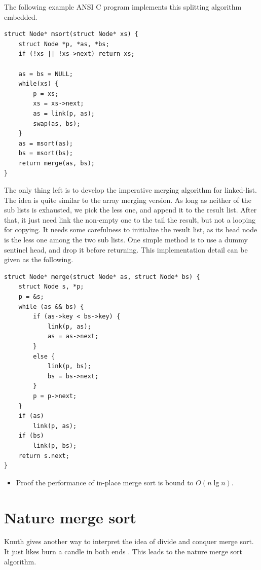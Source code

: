 \documentclass[b5paper]{article}
\begin{document}
The following example ANSI C program implements this splitting algorithm embedded.

\lstset{language=C}
\begin{lstlisting}
struct Node* msort(struct Node* xs) {
    struct Node *p, *as, *bs;
    if (!xs || !xs->next) return xs;

    as = bs = NULL;
    while(xs) {
        p = xs;
        xs = xs->next;
        as = link(p, as);
        swap(as, bs);
    }
    as = msort(as);
    bs = msort(bs);
    return merge(as, bs);
}
\end{lstlisting}

The only thing left is to develop the imperative merging algorithm for linked-list. The idea
is quite similar to the array merging version. As long as neither of the sub lists is exhausted,
we pick the less one, and append it to the result list. After that, it just need link the
non-empty one to the tail the result, but not a looping for copying. It needs some carefulness
to initialize the result list, as its head node is the less one among the two sub lists.
One simple method is to use a dummy sentinel head, and drop it before returning. This implementation
detail can be given as the following.

\lstset{language=C}
\begin{lstlisting}
struct Node* merge(struct Node* as, struct Node* bs) {
    struct Node s, *p;
    p = &s;
    while (as && bs) {
        if (as->key < bs->key) {
            link(p, as);
            as = as->next;
        }
        else {
            link(p, bs);
            bs = bs->next;
        }
        p = p->next;
    }
    if (as)
        link(p, as);
    if (bs)
        link(p, bs);
    return s.next;
}
\end{lstlisting}

\begin{Exercise}
\begin{itemize}
\item Proof the performance of in-place merge sort is bound to $O(n \lg n)$.
\end{itemize}
\end{Exercise}

\section{Nature merge sort}
Knuth gives another way to interpret the idea of divide and conquer merge sort. It just likes
burn a candle in both ends \cite{TAOCP}. This leads to the nature merge sort algorithm.
\end{document}
